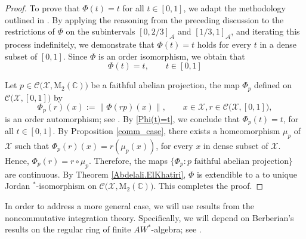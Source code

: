 \documentclass[12pt]{amsart}
\theoremstyle{definition}
\theoremstyle{remark}
\numberwithin{equation}{section}
\begin{document}
\begin{proof}
To prove that $\Phi(t) = t$ for all $t \in [0,1]$, we adapt the methodology outlined in \cite[Proof of Theorem 3.8]{mori}. By applying the reasoning from the preceding discussion to the restrictions of $\Phi$ on the subintervals $[0, 2/3]_{\mathcal{A}}$ and $[1/3, 1]_{\mathcal{A}}$, and iterating this process indefinitely, we demonstrate that $\Phi(t) = t$ holds for every $t$ in a dense subset of $[0,1]$.  Since $\Phi$  is an order isomorphism, we obtain that \begin{equation}\label{Phi(t)=t}
	\Phi(t)=t,  \qquad t\in[0,1]
\end{equation}

Let $p\in\mathcal{C(X},\mathrm{M}_2(\mathbb{C}))$ be a faithful abelian projection, the map $\Phi_p$ defined on $\mathcal{C(X},[0,1])$ by $$\Phi_p(r)(x):=\|\Phi(rp)(x)\|, \qquad x\in\mathcal{X}, r\in\mathcal{C(X},[0,1]),$$
is an order automorphism; see \cite[the proof of Corollary 3.7]{Our}. By \eqref{Phi(t)=t}, we conclude that $\Phi_p(t)=t$, for all $t\in[0,1]$. By Proposition \ref{comm_case},  there exists a homeomorphism $\mu_p$ of $\mathcal{X}$ such that $\Phi_p(r)(x)=r(\mu_p(x))$, for every $x$ in dense subset of $\mathcal{X}$. Hence, $\Phi_p(r)=r\circ\mu_p$. Therefore, the maps $\{\Phi_p: p \mbox{ faithful abelian  projection}\}$ are continuous. By Theorem \ref{Abdelali.ElKhatiri}, $\Phi$ is extendible to a to unique Jordan $^*$-isomorphism on $\mathcal{C(X},\mathrm{M}_2(\mathbb{C}))$.  This completes
the proof.
\end{proof}


In order to address a more general case, we will use   results from the  noncommutative integration theory. Specifically, we will depend  on Berberian's results   on the regular ring of  finite $AW^*$-algebra; see \cite{Berberian, Berberian1}. 
\end{document}
